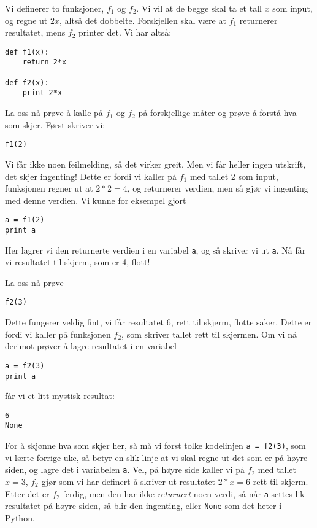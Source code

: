 \documentclass[a4paper, 11pt, notitlepage, english]{article}
\begin{document}
Vi definerer to funksjoner, $f_1$ og $f_2$. Vi vil at de begge skal ta et tall $x$ som input, og regne ut $2x$, altså det dobbelte. Forskjellen skal være at $f_1$ returnerer resultatet, mens $f_2$ printer det. Vi har altså:
\begin{lstlisting}
def f1(x):
    return 2*x

def f2(x):
    print 2*x
\end{lstlisting}
\vspace{-0.3cm}
La oss nå prøve å kalle på $f_1$ og $f_2$ på forskjellige måter og prøve å forstå hva som skjer. Først skriver vi:
\begin{lstlisting}
f1(2)
\end{lstlisting}
\vspace{-0.3cm}
Vi får ikke noen feilmelding, så det virker greit. Men vi får heller ingen utskrift, det skjer ingenting! Dette er fordi vi kaller på $f_1$ med tallet 2 som input, funksjonen regner ut at $2*2 = 4$, og returnerer verdien, men så gjør vi ingenting med denne verdien. Vi kunne for eksempel gjort
\begin{lstlisting}
a = f1(2)
print a
\end{lstlisting}
\vspace{-0.3cm}
Her lagrer vi den returnerte verdien i en variabel \verb+a+, og så skriver vi ut \verb+a+. Nå får vi resultatet til skjerm, som er 4, flott!

La oss nå prøve
\begin{lstlisting}
f2(3)
\end{lstlisting}
\vspace{-0.3cm}
Dette fungerer veldig fint, vi får resultatet 6, rett til skjerm, flotte saker. Dette er fordi vi kaller på funksjonen $f_2$, som skriver tallet rett til skjermen. Om vi nå derimot prøver å lagre resultatet i en variabel
\begin{lstlisting}
a = f2(3)
print a
\end{lstlisting}
\vspace{-0.3cm}
får vi et litt mystisk resultat:
\begin{lstlisting}
6
None
\end{lstlisting}
\vspace{-0.3cm}
For å skjønne hva som skjer her, så må vi først tolke kodelinjen \verb+a = f2(3)+, som vi lærte forrige uke, så betyr en slik linje at vi skal regne ut det som er på høyre-siden, og lagre det i variabelen \verb+a+. Vel, på høyre side kaller vi på $f_2$ med tallet $x=3$, $f_2$ gjør som vi har definert å skriver ut resultatet $2*x=6$ rett til skjerm. Etter det er $f_2$ ferdig, men den har ikke \emph{returnert} noen verdi, så når \verb+a+ settes lik resultatet på høyre-siden, så blir den ingenting, eller \verb+None+ som det heter i Python.
\end{document}
